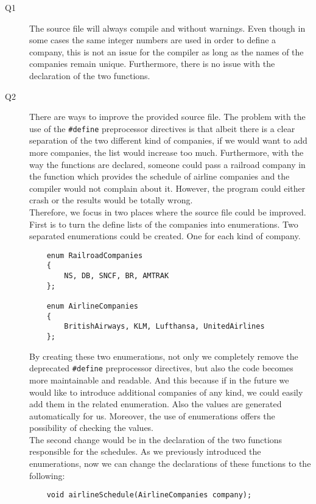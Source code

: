 \documentclass[a4paper]{article}
\begin{document}
\begin{description}
	\item[Q1]\-
	The source file will always compile and without warnings. Even though in some cases the same integer numbers are used in order to define a company, this is not an issue for the compiler as long as the names of the companies remain unique. Furthermore, there is no issue with the declaration of the two functions.
	\item[Q2]\-
	There are ways to improve the provided source file. The problem with the use of the \verb|#define| preprocessor directives is that albeit there is a clear separation of the two different kind of companies, if we would want to add more companies, the list would increase too much. Furthermore, with the way the functions are declared, someone could pass a railroad company in the function which provides the schedule of airline companies and the compiler would not complain about it. However, the program could either crash or the results would be totally wrong.\\
	
	Therefore, we focus in two places where the source file could be improved. First is to turn the define lists of the companies into enumerations. Two separated enumerations could be created. One for each kind of company.
	
	\begin{verbatim}
	enum RailroadCompanies
	{
	    NS, DB, SNCF, BR, AMTRAK
	};
	
	enum AirlineCompanies
	{
	    BritishAirways, KLM, Lufthansa, UnitedAirlines
	};
	\end{verbatim}
	
	By creating these two enumerations, not only we completely remove the deprecated \verb|#define| preprocessor directives, but also the code becomes more maintainable and readable. And this because if in the future we would like to introduce additional companies of any kind, we could easily add them in the related enumeration. Also the values are generated automatically for us. Moreover, the use of enumerations offers the possibility of checking the values.\\
	
	The second change would be in the declaration of the two functions responsible for the schedules. As we previously introduced the enumerations, now we can change the declarations of these functions to the following:
	
	\begin{verbatim}
	void airlineSchedule(AirlineCompanies company);
	

\end{verbatim}
\end{description}
\end{document}

